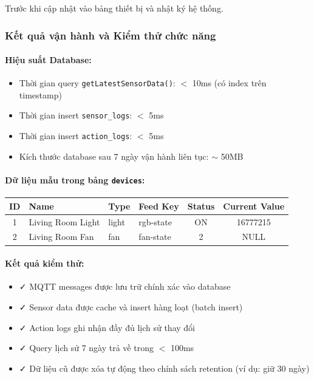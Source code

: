 Trước khi cập nhật vào bảng thiết bị và nhật ký hệ thống.

\subsubsection{Kết quả vận hành và Kiểm thử chức năng}

\paragraph{Hiệu suất Database:}
\begin{itemize}
    \item Thời gian query \texttt{getLatestSensorData()}: $<$ 10ms (có index trên timestamp)
    \item Thời gian insert \texttt{sensor\_logs}: $<$ 5ms
    \item Thời gian insert \texttt{action\_logs}: $<$ 5ms
    \item Kích thước database sau 7 ngày vận hành liên tục: $\sim$ 50MB
\end{itemize}

\paragraph{Dữ liệu mẫu trong bảng \texttt{devices}:}

\begin{center}
\begin{tabular}{|c|l|l|l|c|c|}
\hline
\textbf{ID} & \textbf{Name} & \textbf{Type} & \textbf{Feed Key} & \textbf{Status} & \textbf{Current Value} \\
\hline
1 & Living Room Light & light & rgb-state & ON & 16777215 \\
\hline
2 & Living Room Fan & fan & fan-state & 2 & NULL \\
\hline
\end{tabular}
\end{center}

\paragraph{Kết quả kiểm thử:}
\begin{itemize}
    \item ✓ MQTT messages được lưu trữ chính xác vào database
    \item ✓ Sensor data được cache và insert hàng loạt (batch insert)
    \item ✓ Action logs ghi nhận đầy đủ lịch sử thay đổi
    \item ✓ Query lịch sử 7 ngày trả về trong $<$ 100ms
    \item ✓ Dữ liệu cũ được xóa tự động theo chính sách retention (ví dụ: giữ 30 ngày)
\end{itemize}

